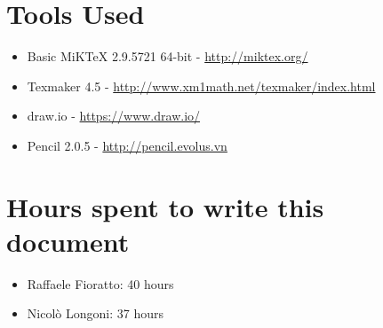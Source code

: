 \break
\section*{Tools Used}
\begin{itemize}
\item Basic MiKTeX 2.9.5721 64-bit - \url{http://miktex.org/}
\item Texmaker 4.5 - \url{http://www.xm1math.net/texmaker/index.html}
\item draw.io - \url{https://www.draw.io/}
\item Pencil 2.0.5 - \url{http://pencil.evolus.vn}
\end{itemize}
\section*{Hours spent to write this document}
\begin{itemize}
\item Raffaele Fioratto: 40 hours
\item Nicol\`{o} Longoni: 37 hours
\end{itemize}
